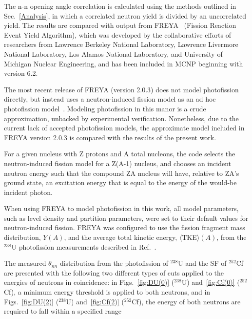 The n-n opening angle correlation is calculated using the methods outlined in Sec.~\ref{Analysis}, in which a correlated neutron yield is divided by an uncorrelated yield.
The results are compared with output from FREYA~\cite{FREYA} (Fission Reaction Event Yield Algorithm), which was developed by the collaborative efforts of researchers from Lawrence Berkeley National Laboratory,  Lawrence Livermore National Laboratory, Los Alamos National Laboratory, and University of Michigan Nuclear Engineering, and has been included in MCNP beginning with version 6.2.
 
The most recent release of FREYA (version 2.0.3) does not model photofission directly, but instead uses a neutron-induced fission model as an ad hoc photofission model~\cite{FREYA_photofission}.
Modeling photofission in this manor is a crude approximation, unbacked by experimental verification.
Nonetheless, due to the current lack of accepted photofission models, the approximate model included in FREYA version 2.0.3 is compared with the results of the present work. 

For a given nucleus with Z protons and A total nucleons, the code selects the neutron-induced fission model for a Z(A-1) nucleus, and chooses an incident neutron energy such that the compound ZA nucleus will have, relative to ZA's ground state, an excitation energy that is equal to the energy of the would-be incident photon.

When using FREYA to model photofission in this work, all model parameters, such as level density and partition parameters, were set to their default values for neutron-induced fission.
FREYA was configured to use the fission fragment mass distribution, $Y(A)$, and the average total kinetic energy, $\langle$TKE$\rangle(A)$, from the $^{238}$U photofission measurements described in Ref.~\cite{2017Krishichayan}.


The measured $\theta_{nn}$ distribution from the photofission of $^{238}$U and the SF of $^{252}$Cf are presented with the following two different types of cuts applied to the energies of neutrons in coincidence:
in Figs.~\ref{fig:DU(0)} ($^{238}$U) and~\ref{fig:Cf(0)} ($^{252}$Cf), a minimum energy threshold is applied to both neutrons, and in Figs.~\ref{fig:DU(2)} ($^{238}$U) and~\ref{fig:Cf(2)} ($^{252}$Cf), the energy of both neutrons are required to fall within a specified range

